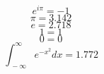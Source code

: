 \documentclass{article}%
\begin{document}
%
\normalsize%
\[%
e^{i\pi } = {-}1%
\]%
\[%
\pi = 3.142%
\]%
\[%
e = 2.718%
\]%
\[%
1 = 1%
\]%
\[%
0 = 0%
\]%
\[%
\int _{\:-\infty }^{\infty }e^{-x^2}dx = 1.772%
\]%
\end{document}
